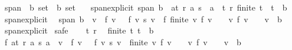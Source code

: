 \begin{isabellebody}
\endisatagproof
{\isafoldproof}%
%
\isadelimproof
%
\endisadelimproof
%
\isadelimdocument
%
\endisadelimdocument
%
\isatagdocument
%
\isamarkuptrue%
%
\endisatagdocument
{\isafolddocument}%
%
\isadelimdocument
%
\endisadelimdocument
{}\isamarkupfalse%
\ span\ {\isacharcolon}{\kern0pt}{\isacharcolon}{\kern0pt}\ {\isachardoublequoteopen}{\isacharprime}{\kern0pt}b\ set\ {\isasymRightarrow}\ {\isacharprime}{\kern0pt}b\ set{\isachardoublequoteclose}\isanewline
\ \ \ span{\isacharunderscore}{\kern0pt}explicit{\isacharcolon}{\kern0pt}\ {\isachardoublequoteopen}span\ b\ {\isacharequal}{\kern0pt}\ {\isacharbraceleft}{\kern0pt}{\isacharparenleft}{\kern0pt}{\isasymSum}a{\isasymin}t{\isachardot}{\kern0pt}\ r\ a\ {\isacharasterisk}{\kern0pt}s\ \ a{\isacharparenright}{\kern0pt}\ {\isacharbar}{\kern0pt}\ t\ r{\isachardot}{\kern0pt}\ finite\ t\ {\isasymand}\ t\ {\isasymsubseteq}\ b{\isacharbraceright}{\kern0pt}{\isachardoublequoteclose}\isanewline
\isanewline
{}\isamarkupfalse%
\ span{\isacharunderscore}{\kern0pt}explicit{\isacharprime}{\kern0pt}{\isacharcolon}{\kern0pt}\isanewline
\ \ {\isachardoublequoteopen}span\ b\ {\isacharequal}{\kern0pt}\ {\isacharbraceleft}{\kern0pt}{\isacharparenleft}{\kern0pt}{\isasymSum}v\ {\isacharbar}{\kern0pt}\ f\ v\ {\isasymnoteq}\ {}{\isachardot}{\kern0pt}\ f\ v\ {\isacharasterisk}{\kern0pt}s\ v{\isacharparenright}{\kern0pt}\ {\isacharbar}{\kern0pt}\ f{\isachardot}{\kern0pt}\ finite\ {\isacharbraceleft}{\kern0pt}v{\isachardot}{\kern0pt}\ f\ v\ {\isasymnoteq}\ {}{\isacharbraceright}{\kern0pt}\ {\isasymand}\ {\isacharparenleft}{\kern0pt}{\isasymforall}v{\isachardot}{\kern0pt}\ f\ v\ {\isasymnoteq}\ {}\ {\isasymlongrightarrow}\ v\ {\isasymin}\ b{\isacharparenright}{\kern0pt}{\isacharbraceright}{\kern0pt}{\isachardoublequoteclose}\isanewline
%
\isadelimproof
\ \ %
\endisadelimproof
%
\isatagproof
{}\isamarkupfalse%
\ span{\isacharunderscore}{\kern0pt}explicit\isanewline
{}\isamarkupfalse%
\ safe\isanewline
\ \ \isamarkupfalse%
\ t\ r\ \isamarkupfalse%
\ {\isachardoublequoteopen}finite\ t{\isachardoublequoteclose}\ {\isachardoublequoteopen}t\ {\isasymsubseteq}\ b{\isachardoublequoteclose}\isanewline
\ \ \isamarkupfalse%
\ \isamarkupfalse%
\ {\isachardoublequoteopen}{\isasymexists}f{\isachardot}{\kern0pt}\ {\isacharparenleft}{\kern0pt}{\isasymSum}a{\isasymin}t{\isachardot}{\kern0pt}\ r\ a\ {\isacharasterisk}{\kern0pt}s\ a{\isacharparenright}{\kern0pt}\ {\isacharequal}{\kern0pt}\ {\isacharparenleft}{\kern0pt}{\isasymSum}v\ {\isacharbar}{\kern0pt}\ f\ v\ {\isasymnoteq}\ {}{\isachardot}{\kern0pt}\ f\ v\ {\isacharasterisk}{\kern0pt}s\ v{\isacharparenright}{\kern0pt}\ {\isasymand}\ finite\ {\isacharbraceleft}{\kern0pt}v{\isachardot}{\kern0pt}\ f\ v\ {\isasymnoteq}\ {}{\isacharbraceright}{\kern0pt}\ {\isasymand}\ {\isacharparenleft}{\kern0pt}{\isasymforall}v{\isachardot}{\kern0pt}\ f\ v\ {\isasymnoteq}\ {}\ {\isasymlongrightarrow}\ v\ {\isasymin}\ b{\isacharparenright}{\kern0pt}{\isachardoublequoteclose}\isanewline

\end{isabellebody}
